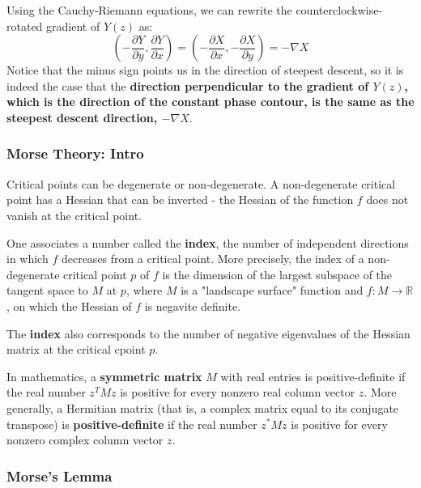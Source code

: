 Using the Cauchy-Riemann equations, we can rewrite the counterclockwise-rotated gradient of $Y(z)$ as:
$$
\left( -\frac{\partial Y}{\partial y}, \frac{\partial Y}{\partial x}\right)
= \left(-\frac{\partial X}{\partial x}, -\frac{\partial X}{\partial y}\right) = -\nabla X
$$
Notice that the minus sign points us in the direction of steepest descent,
so it is indeed the case that the \textbf{direction perpendicular to the gradient of $Y(z)$,
which is the direction of the constant phase contour,
is the same as the steepest descent direction, $-\nabla X$}.







\subsubsection{Morse Theory: Intro}

Critical points can be degenerate or non-degenerate.
A non-degenerate critical point has a Hessian that can be inverted - the Hessian of the function $f$ does not vanish
at the critical point.

One associates a number called the \textbf{index}, the number of independent directions in which
$f$ decreases from a critical point.
More precisely, the index of a non-degenerate critical point $p$ of $f$ is the dimension of the largest subspace
of the tangent space to $M$ at $p$, where $M$ is a "landscape surface" function and $f : M \rightarrow \mathbb{R}$,
on which the Hessian of $f$ is negavite definite.

The \textbf{index} also corresponds to the number of negative eigenvalues of the Hessian matrix at the critical cpoint $p$.


In mathematics, a \textbf{symmetric matrix} $M$ with real entries is positive-definite if the real number $z^T M z$
is positive for every nonzero real column vector $z$.
More generally, a Hermitian matrix (that is, a complex matrix equal to its conjugate transpose) is \textbf{positive-definite}
if the real number $z^* M z$ is positive for every nonzero complex column vector $z$.



\subsubsection{Morse's Lemma}

